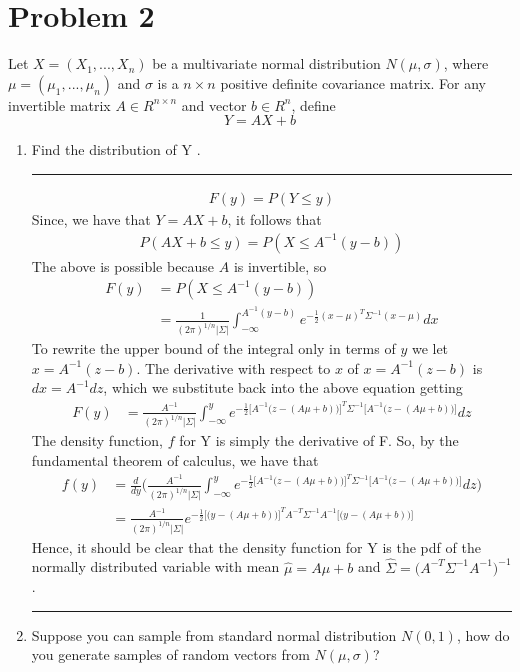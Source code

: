 \documentclass{article} %
\begin{document}
 \section*{Problem 2}
Let $X = (X_1,...,X_n)$ be a multivariate normal distribution $N(\mu,\sigma)$, where $\mu = (\mu_1,...,\mu_n)$ and $\sigma$ is a $n \times n$ positive definite covariance matrix. For any invertible matrix $A \in R^{n\times n}$ and vector $b \in R^n$, define
\[Y = AX + b\]
\begin{enumerate}
\item Find the distribution of Y .\\
\rule{\textwidth}{1pt}
\begin{align*}
F(y) = P(Y\le y)
\end{align*}
Since, we have that $Y=AX+b$, it follows that 
\begin{align*}
P(AX+b\le y) = P(X \le A^{-1}(y-b))
\end{align*}
The above is possible because $A$ is invertible, so
\begin{align*}
F(y) &= P(X \le A^{-1}(y-b)) \\
&= \frac{1}{(2\pi)^{1/n}|\Sigma|} \int_{-\infty}^{A^{-1}(y-b)}e^{-\frac{1}{2}(x-\mu)^T\Sigma^{-1}(x-\mu)}dx
\end{align*}
To rewrite the upper bound of the integral only in terms of $y$ we let $x=A^{-1}(z-b)$. The derivative with respect to $x$ of $x=A^{-1}(z-b)$ is $dx=A^{-1}dz$, which we substitute back into the above equation getting
\begin{align*}
F(y) &= \frac{A^{-1}}{(2\pi)^{1/n}|\Sigma|} \int_{-\infty}^{y}e^{-\frac{1}{2}\Big[A^{-1}\big(z-(A\mu+b)\big)\Big]^T\Sigma^{-1}\Big[A^{-1}\big(z-(A\mu+b)\big)\Big]}dz
\end{align*}
The density function, $f$ for Y is simply the derivative of F. So, by the fundamental theorem of calculus, we have that
\begin{align*}  
f(y) &= \frac{d}{dy} \Bigg(  \frac{A^{-1}}{(2\pi)^{1/n}|\Sigma|} \int_{-\infty}^{y}e^{-\frac{1}{2}\Big[A^{-1}\big(z-(A\mu+b)\big)\Big]^T\Sigma^{-1}\Big[A^{-1}\big(z-(A\mu+b)\big)\Big]}dz  \Bigg) \\
&= \frac{A^{-1}}{(2\pi)^{1/n}|\Sigma|} e^{-\frac{1}{2}\Big[\big(y-(A\mu+b)\big)\Big]^TA^{-T}\Sigma^{-1}A^{-1}\Big[\big(y-(A\mu+b)\big)\Big]} 
\end{align*}
Hence, it should be clear that the density function for Y is the pdf of the normally distributed variable with mean $\hat{\mu} = A\mu+b$ and $\hat{\Sigma} = \Big(A^{-T}\Sigma^{-1}A^{-1}\Big)^{-1}$.
~\\
\rule{\textwidth}{1pt}
\item Suppose you can sample from standard normal distribution $N(0,1)$, how do you generate samples of random vectors from $N(\mu,\sigma)$?


\end{enumerate}
\end{document}
